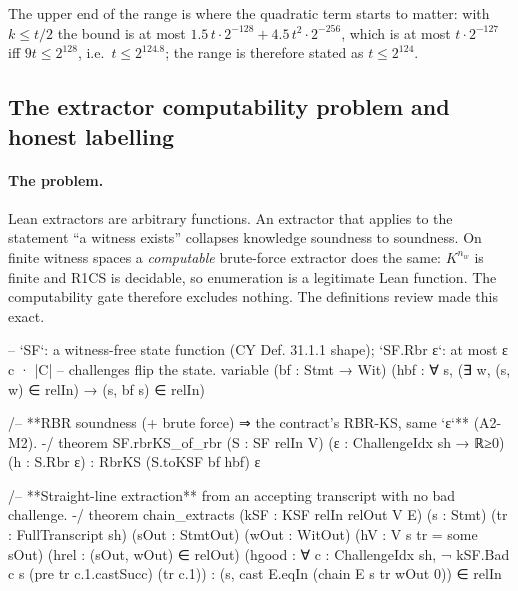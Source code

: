 \noindent The upper end of the range is where the quadratic term starts to matter: with $k\le t/2$
the bound is at most $1.5\,t\cdot2^{-128}+4.5\,t^2\cdot2^{-256}$, which is at most $t\cdot2^{-127}$
iff $9t\le2^{128}$, i.e.\ $t\le2^{124.8}$; the range is therefore stated as $t\le2^{124}$.

\subsection{The extractor computability problem and honest labelling}\label{subsec:sec-extractor}

\paragraph{The problem.} Lean extractors are arbitrary functions. An extractor that applies
 to the statement \enquote{a witness exists} collapses knowledge soundness
to soundness. On finite witness spaces a \emph{computable} brute-force extractor does the same:
$K^{n_w}$ is finite and R1CS is decidable, so enumeration is a legitimate Lean function. The
computability gate therefore excludes nothing. The definitions review made this exact.


\begin{leancode}[fontsize=\footnotesize,label={\footnotesize Library/RbrSound.lean (untrusted, kernel-checked; abridged)}]
-- `SF`: a witness-free state function (CY Def. 31.1.1 shape); `SF.Rbr ε`: at most ε c · |C|
-- challenges flip the state.
variable (bf : Stmt → Wit) (hbf : ∀ s, (∃ w, (s, w) ∈ relIn) → (s, bf s) ∈ relIn)

/-- **RBR soundness (+ brute force) ⇒ the contract's RBR-KS, same `ε`** (A2-M2). -/
theorem SF.rbrKS_of_rbr (S : SF relIn V) (ε : ChallengeIdx sh → ℝ≥0) (h : S.Rbr ε) :
    RbrKS (S.toKSF bf hbf) ε

/-- **Straight-line extraction** from an accepting transcript with no bad challenge. -/
theorem chain_extracts (kSF : KSF relIn relOut V E) (s : Stmt) (tr : FullTranscript sh)
    (sOut : StmtOut) (wOut : WitOut) (hV : V s tr = some sOut) (hrel : (sOut, wOut) ∈ relOut)
    (hgood : ∀ c : ChallengeIdx sh, ¬ kSF.Bad c s (pre tr c.1.castSucc) (tr c.1)) :
    (s, cast E.eqIn (chain E s tr wOut 0)) ∈ relIn
\end{leancode}

